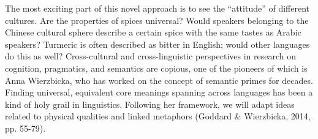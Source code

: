 The most exciting part of this novel approach is to see the ``attitude'' of different cultures. Are the properties of spices universal? Would speakers belonging to the Chinese cultural sphere describe a certain spice with the same tastes as Arabic speakers? Turmeric is often described as bitter in English; would other languages do this as well? Cross-cultural and cross-linguistic perspectives in research on cognition, pragmatics, and semantics are copious, one of the pioneers of which is Anna Wierzbicka, who has worked on the concept of semantic primes for decades. Finding universal, equivalent core meanings spanning across languages has been a kind of holy grail in linguistics. Following her framework, we will adapt ideas related to physical qualities and linked metaphors (Goddard \& Wierzbicka, 2014, pp. 55-79).














